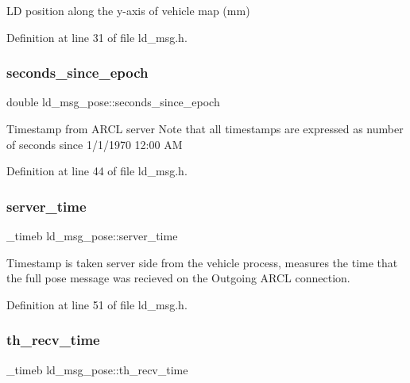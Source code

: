 LD position along the y-\/axis of vehicle map (mm) 

Definition at line 31 of file ld\+\_\+msg.\+h.

\mbox{\label{structld__msg__pose_ad26937c8008680739f207cbc0d76c003}} 
\subsubsection{\texorpdfstring{seconds\+\_\+since\+\_\+epoch}{seconds\_since\_epoch}}
{\footnotesize\ttfamily double ld\+\_\+msg\+\_\+pose\+::seconds\+\_\+since\+\_\+epoch}

Timestamp from A\+R\+CL server Note that all timestamps are expressed as number of seconds since 1/1/1970 12\+:00 AM 

Definition at line 44 of file ld\+\_\+msg.\+h.

\mbox{\label{structld__msg__pose_a812b4a4a731bc33b0a356b1340610e28}} 
\subsubsection{\texorpdfstring{server\+\_\+time}{server\_time}}
{\footnotesize\ttfamily \+\_\+timeb ld\+\_\+msg\+\_\+pose\+::server\+\_\+time}

Timestamp is taken server side from the vehicle process, measures the time that the full pose message was recieved on the Outgoing A\+R\+CL connection. 

Definition at line 51 of file ld\+\_\+msg.\+h.

\mbox{\label{structld__msg__pose_acf025c0af4d2a3195c42d9ca133d3e74}} 
\subsubsection{\texorpdfstring{th\+\_\+recv\+\_\+time}{th\_recv\_time}}
{\footnotesize\ttfamily \+\_\+timeb ld\+\_\+msg\+\_\+pose\+::th\+\_\+recv\+\_\+time}

